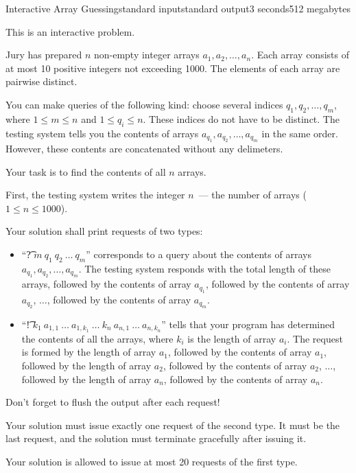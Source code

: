 \begin{problem}{Interactive Array Guessing}{standard input}{standard output}{3 seconds}{512 megabytes}

This is an interactive problem.

Jury has prepared $n$ non-empty integer arrays $a_1, a_2, \ldots, a_n$. Each array consists of at most 10 positive integers not exceeding 1000. The elements of each array are pairwise distinct.

You can make queries of the following kind: choose several indices $q_1, q_2, \ldots, q_m$, where $1 \le m \le n$ and $1 \le q_i \le n$. These indices do not have to be distinct. The testing system tells you the contents of arrays $a_{q_1}, a_{q_2}, \ldots, a_{q_m}$ in the same order. However, these contents are concatenated without any delimeters.

Your task is to find the contents of all $n$ arrays.

\Interaction
First, the testing system writes the integer $n$~--- the number of arrays ($1 \leq n \leq 1000$).

Your solution shall print requests of two types:
\begin{itemize}
\item ``\t{? }$m\ q_1\ q_2\ \ldots\ q_m$'' corresponds to a query about the contents of arrays $a_{q_1}, a_{q_2}, \ldots, a_{q_m}$. The testing system responds with the total length of these arrays, followed by the contents of array $a_{q_1}$, followed by the contents of array $a_{q_2}$, $\ldots$, followed by the contents of array $a_{q_m}$.
\item ``\t{! }$k_1\ a_{1, 1}\ \ldots\ a_{1, k_1}\ \ldots\ k_n\ a_{n, 1}\ \ldots\ a_{n, k_n}$'' tells that your program has determined the contents of all the arrays, where $k_i$ is the length of array $a_i$. The request is formed by the length of array $a_1$, followed by the contents of array $a_1$, followed by the length of array $a_2$, followed by the contents of array $a_2$, $\ldots$, followed by the length of array $a_n$, followed by the contents of array $a_n$.
\end{itemize}

Don't forget to flush the output after each request!

Your solution must issue exactly one request of the second type. It must be the last request, and the solution must terminate gracefully after issuing it.

Your solution is allowed to issue at most 20 requests of the first type.




\Example

\begin{example}
%
\end{example}

\end{problem}

